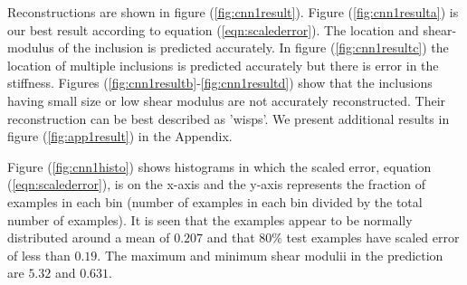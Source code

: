 \documentclass[12pt]{article}
\begin{document}
Reconstructions are shown in figure (\ref{fig:cnn1result}). Figure (\ref{fig:cnn1resulta}) is our best result according to equation (\ref{eqn:scalederror}). The location and shear-modulus of the inclusion is predicted accurately. In figure (\ref{fig:cnn1resultc}) the location of multiple inclusions is predicted accurately but there is error in the stiffness. Figures (\ref{fig:cnn1resultb}-\ref{fig:cnn1resultd}) show that the inclusions having small size or low shear modulus are not accurately reconstructed. Their reconstruction can be best described as 'wisps'. We present additional results in figure (\ref{fig:app1result}) in the Appendix.

Figure (\ref{fig:cnn1histo}) shows histograms in which the scaled error, equation (\ref{eqn:scalederror}), is on the x-axis and the y-axis represents the fraction of examples in each bin (number of examples in each bin divided by the total number of examples). It is seen that the examples appear to be normally distributed around a mean of ${0.207}$ and that $80\%$ test examples have scaled error of less than $0.19$. The maximum and minimum shear modulii in the prediction are $5.32$ and $0.631$. 
\end{document}
